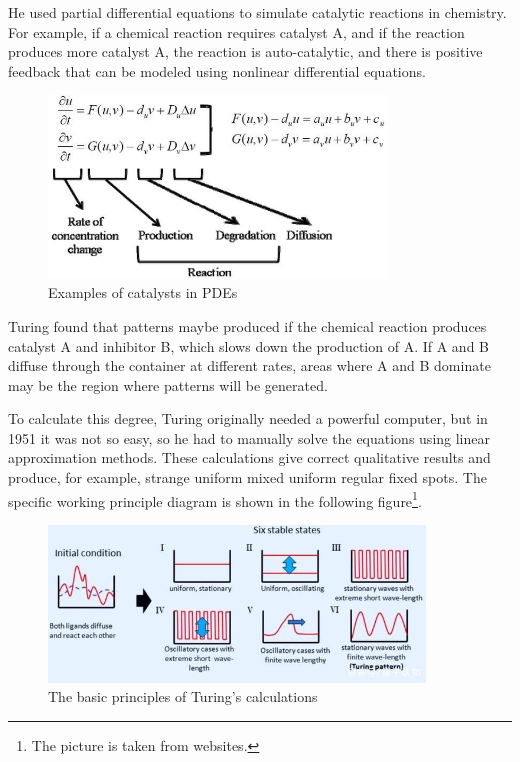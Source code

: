 \documentclass[12pt]{article}
\begin{document}
\noindent He used partial differential equations to simulate catalytic reactions in chemistry. For example, if a chemical reaction requires catalyst A, and if the reaction produces more catalyst A, the reaction is auto-catalytic, and there is positive feedback that can be modeled using nonlinear differential equations.

\begin{figure}[H]
\centering
\includegraphics[width=9cm]{Formula in 2.3.1.jpg}
\caption{Examples of catalysts in PDEs}
\label{fig:my_label}
\end{figure}
\vspace{12pt}

\noindent Turing found that patterns maybe produced if the chemical reaction produces catalyst A and inhibitor B, which slows down the production of A. If A and B diffuse through the container at different rates, areas where A and B dominate may be the region where patterns will be generated.
\vspace{24pt}

\noindent To calculate this degree, Turing originally needed a powerful computer, but in 1951 it was not so easy, so he had to manually solve the equations using linear approximation methods. These calculations give correct qualitative results and produce, for example, strange uniform mixed uniform regular fixed spots. The specific working principle diagram is shown in the following figure\footnote{The picture is taken from websites.}.

\begin{figure}[H]
\centering
\includegraphics[width=10cm]{wave box.jpg}
\caption{The basic principles of Turing's calculations}

\end{figure}
\vspace{24pt}
\end{document}
